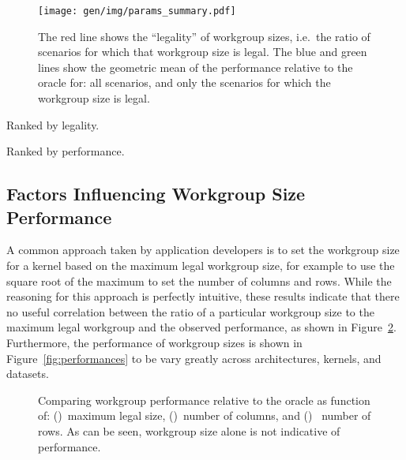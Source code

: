 
\begin{figure}
\centering
\texttt{[image: gen/img/params\_summary.pdf]}
\caption{%
  The red line shows the ``legality'' of workgroup sizes, i.e.\ the
  ratio of scenarios for which that workgroup size is legal.  The blue
  and green lines show the geometric mean of the performance relative
  to the oracle for: all scenarios, and only the scenarios for which
  the workgroup size is legal.%
}
\label{fig:performance-legality}
\end{figure}


\begin{table}
  \parbox{.45\linewidth}{
    \centering
    \scriptsize
    
    \caption{Ranked by legality.}
  }
  \hfill
  \parbox{.45\linewidth}{
    \centering
    \scriptsize
    
    \caption{Ranked by performance.}
  }
\end{table}


\subsection{Factors Influencing Workgroup Size Performance}


A common approach taken by application developers is to set the
workgroup size for a kernel based on the maximum legal workgroup size,
for example to use the square root of the maximum to set the number of
columns and rows. While the reasoning for this approach is perfectly
intuitive, these results indicate that there no useful correlation
between the ratio of a particular workgroup size to the maximum legal
workgroup and the observed performance, as shown in
Figure~\ref{fig:performance-wgsizes}. Furthermore, the performance of
workgroup sizes is shown in Figure~\ref{fig:performances} to be vary
greatly across architectures, kernels, and datasets.


\clearpage
\begin{figure}

\caption{%
  Comparing workgroup performance relative to the oracle as function
  of: ()~maximum legal size,
  ()~number of columns, and
  ()~ number of rows. As can be seen,
  workgroup size alone is not indicative of performance.%
}
\label{fig:performance-wgsizes}
\end{figure}

